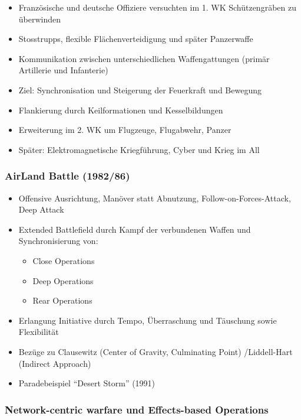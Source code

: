 {}\documentclass[a4paper]{article}
\providecommand{\tightlist}{\setlength{\itemsep}{1mm}\setlength{\parskip}{1mm}}
\begin{document}
\begin{itemize}
	\tightlist
	\item
	      Französische und deutsche Offiziere versuchten im 1. WK Schützengräben
	      zu überwinden
	\item
	      Stosstrupps, flexible Flächenverteidigung und später Panzerwaffe
	\item
	      Kommunikation zwischen unterschiedlichen Waffengattungen (primär
	      Artillerie und Infanterie)
	\item
	      Ziel: Synchronisation und Steigerung der Feuerkraft und Bewegung
	\item
	      Flankierung durch Keilformationen und Kesselbildungen
	\item
	      Erweiterung im 2. WK um Flugzeuge, Flugabwehr, Panzer
	\item
	      Später: Elektromagnetische Kriegführung, Cyber und Krieg im All
\end{itemize}

\subsubsection{AirLand Battle (1982/86)}\label{airland-battle-198286}

\begin{itemize}
	\tightlist
	\item
	      Offensive Ausrichtung, Manöver statt Abnutzung,
	      Follow-on-Forces-Attack, Deep Attack
	\item
	      Extended Battlefield durch Kampf der verbundenen Waffen und
	      Synchronisierung von:

	      \begin{itemize}
		      \tightlist
		      \item
		            Close Operations
		      \item
		            Deep Operations
		      \item
		            Rear Operations
	      \end{itemize}
	\item
	      Erlangung Initiative durch Tempo, Überraschung und Täuschung sowie
	      Flexibilität
	\item
	      Bezüge zu Clausewitz (Center of Gravity, Culminating Point)
	      /Liddell-Hart (Indirect Approach)
	\item
	      Paradebeispiel ``Desert Storm'' (1991)
\end{itemize}

\subsubsection{Network-centric warfare und Effects-based
	Operations}\label{network-centric-warfare-und-effects-based-operations}
\end{document}
